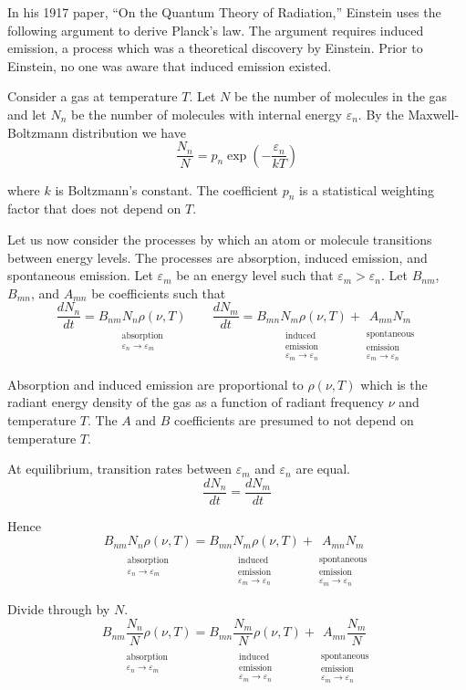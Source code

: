 \documentclass[12pt]{article}
\newcommand\BNM{B_{nm}} %
\newcommand\BMN{B_{mn}} %
\newcommand\AMN{A_{mn}} %
\newcommand\RHO{\rho(\nu,T)}
\newcommand\ABSORPTION{\substack{\\[1ex] \text{absorption}\\ \varepsilon_n\rightarrow\varepsilon_m}}
\newcommand\INDUCED{\substack{\\[1ex] \text{induced}\\ \text{emission}\\ \varepsilon_m\rightarrow\varepsilon_n}}
\newcommand\SPONTANEOUS{\substack{\\[1ex] \text{spontaneous}\\ \text{emission}\\ \varepsilon_m\rightarrow\varepsilon_n}}
\begin{document}
\noindent
In his 1917 paper, ``On the Quantum Theory of Radiation,''
Einstein uses the following argument to derive Planck's law.
The argument requires induced emission, a process which was a theoretical discovery by Einstein.
Prior to Einstein, no one was aware that induced emission existed.

\bigskip
\noindent
Consider a gas at temperature $T$.
Let $N$ be the number of molecules in the gas
and let $N_n$ be the number of molecules with internal energy $\varepsilon_n$.
By the Maxwell-Boltzmann distribution we have
\begin{equation*}
\frac{N_n}{N}=p_n\exp\left(-\frac{\varepsilon_n}{kT}\right)
\tag{1}
\end{equation*}

\noindent
where $k$ is Boltzmann's constant.
The coefficient $p_n$ is a statistical weighting factor that does not depend on $T$.

\bigskip
\noindent
Let us now consider the processes by which an atom or molecule transitions between energy levels.
The processes are absorption, induced emission, and spontaneous emission.
Let $\varepsilon_m$ be an energy level such that $\varepsilon_m>\varepsilon_n$.
Let $\BNM$, $\BMN$, and $\AMN$ be coefficients such that
\begin{equation*}
\frac{dN_n}{dt}=\underset{\ABSORPTION}{\BNM N_n \RHO}
\qquad
\frac{dN_m}{dt}
=\underset{\INDUCED}{\BMN N_m \RHO}
+
\underset{\SPONTANEOUS}{\AMN N_m}
\end{equation*}

\noindent
Absorption and induced emission are proportional to $\RHO$
which is the radiant energy density of the gas
as a function of radiant frequency $\nu$ and temperature $T$.
The $A$ and $B$ coefficients are presumed to not depend on temperature $T$.

\bigskip
\noindent
At equilibrium, transition rates between $\varepsilon_m$ and $\varepsilon_n$ are equal.
\begin{equation*}
\frac{dN_n}{dt}=\frac{dN_m}{dt}
\end{equation*}

\noindent
Hence
\begin{equation*}
\underset{\ABSORPTION}{\BNM N_n \RHO}
=\underset{\INDUCED}{\BMN N_m \RHO}
+\underset{\SPONTANEOUS}{\AMN N_m}
\end{equation*}

\noindent
Divide through by $N$.
\begin{equation*}
\underset{\ABSORPTION}{\BNM \frac{N_n}{N} \RHO}
=\underset{\INDUCED}{\BMN \frac{N_m}{N} \RHO}
+\underset{\SPONTANEOUS}{\AMN \frac{N_m}{N}}
\end{equation*}
\end{document}
